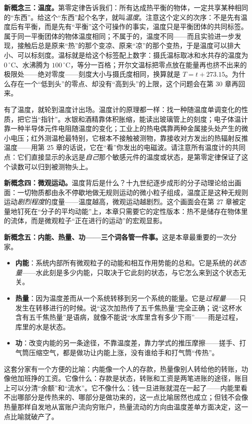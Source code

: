 \begin{mainline}
\textbf{新概念三：温度。}第零定律告诉我们：所有达成热平衡的物体，一定共享某种相同的“东西”。给这个“东西”起个名字，就叫\emph{温度}。注意这个定义的次序：不是先有温度后有平衡，而是先有“平衡”这个可操作的事实，温度只是平衡团体的共同标签。属于同一平衡团体的物体温度相同；不属于的，温度不同——而且实验进一步发现，接触后总是原来“热”的那个变凉、原来“凉”的那个变热，于是温度可以排大小、可以标刻度。温标就是给这个标签配上数字：摄氏温标取冰和水共存的温度为 \(0\,^\circ\mathrm{C}\)、水沸腾为 \(100\,^\circ\mathrm{C}\)，等分一百格；开尔文温标把零点放在能量再也挤不出来的极限处——绝对零度——刻度大小与摄氏度相同，换算就是 \(T = t + 273.15\)。为什么存在一个“低到头”的零点、却没有“高到头”的上限，这个问题会在第 30 章再回来。

有了温度，就轮到温度计出场。温度计的原理都一样：找一种随温度单调变化的性质，把它当“指针”。水银和酒精靠体积胀缩，能读出玻璃管上的刻度；电子体温计靠一种半导体元件电阻随温度的变化；工业上的热电偶靠两种金属接头处产生的微小电压；红外测温枪最特别，它根本不接触被测物，靠接收对方发出的热辐射反推温度——用第 25 章的话说，它在“看”你发出的电磁波。请注意所有温度计的共同点：它们直接显示的永远是\emph{自己}那个敏感元件的温度或状态，是第零定律保证了这个读数可以归到被测物头上。

\textbf{新概念四：微观运动。}温度背后是什么？十九世纪逐步成形的分子动理论给出画面：一切物质都由永不停歇地做无规则运动的微小粒子组成，温度正是这种无规则运动\emph{剧烈程度}的度量——温度越高，微观运动越剧烈。这个画面会在第 27 章被定量地钉死在“分子的平均动能”上，本章只需要它的定性版本：热不是储存在物体里的流体，而是微观粒子“正在进行的运动”的宏观显影。

\textbf{新概念五：内能、热量、功——三个词各管一件事。}这是本章最重要的一次分家。
\begin{itemize}[leftmargin=1.8em]
\item \textbf{内能}：系统内部所有微观粒子的动能和相互作用势能的总和。它是系统的\emph{状态量}——水此刻是多少内能，只取决于它此刻的状态，与它怎么来到这个状态无关。
\item \textbf{热量}：因为温度差而从一个系统转移到另一个系统的能量。它是\emph{过程量}——只发生在转移进行的时候。说“这次加热传了五千焦热量”完全正确；说“这杯水含有五千焦热量”是语病，就像不能说“水库里含有多少下雨”——雨是过程，库里的水是状态。
\item \textbf{功}：改变内能的另一条途径，不靠温度差，靠力学式的推压摩擦——搓手、打气筒压缩空气，都是做功让内能上涨，没有谁给手和打气筒“传热”。
\end{itemize}
这套分家有一个方便的比喻：内能像一个人的存款，热量像别人转给他的转账，功像他加班挣的工资。它像什么：存款是状态，转账和工资是两笔进账的途径，账目上可以分清“余额”和“流水”。它不像什么：钱一旦进账就混在一起了——内能里看不出哪部分是传热来的、哪部分是做功来的，这一点比喻居然也成立；但钱不会像热量那样自发地从富账户流向穷账户，热量流动的方向由温度差单方面决定，这一点比喻就破产了。
\end{mainline}

